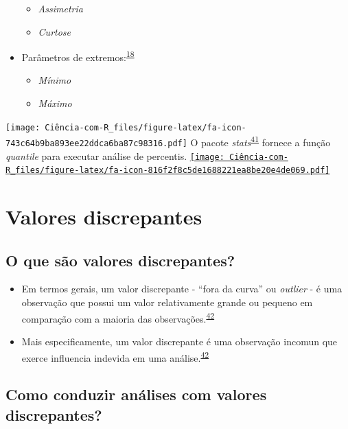 \documentclass[
]{book}
\begin{document}
\begin{itemize}
  \begin{itemize}
  \item
    \emph{Assimetria}
  \item
    \emph{Curtose}
  \end{itemize}
\item
  Parâmetros de extremos:\textsuperscript{\protect\hyperlink{ref-Ali2016}{18}}

  \begin{itemize}
  \item
    \emph{Mínimo}
  \item
    \emph{Máximo}
  \end{itemize}
\end{itemize}

\texttt{[image: Ciência-com-R\_files/figure-latex/fa-icon-743c64b9ba893ee22ddca6ba87c98316.pdf]} O pacote \emph{stats}\textsuperscript{\protect\hyperlink{ref-base}{41}} fornece a função \emph{quantile} para executar análise de percentis. \href{https://stat.ethz.ch/R-manual/R-devel/library/stats/html/quantile.html}{\texttt{[image: Ciência-com-R\_files/figure-latex/fa-icon-816f2f8c5de1688221ea8be20e4de069.pdf]}}

\hypertarget{outliers}{%
\section{Valores discrepantes}\label{outliers}}

\hypertarget{o-que-suxe3o-valores-discrepantes}{%
\subsection{O que são valores discrepantes?}\label{o-que-suxe3o-valores-discrepantes}}

\begin{itemize}
\item
  Em termos gerais, um valor discrepante - ``fora da curva'' ou \emph{outlier} - é uma observação que possui um valor relativamente grande ou pequeno em comparação com a maioria das observações.\textsuperscript{\protect\hyperlink{ref-zuur2009}{42}}
\item
  Mais especificamente, um valor discrepante é uma observação incomun que exerce influencia indevida em uma análise.\textsuperscript{\protect\hyperlink{ref-zuur2009}{42}}
\end{itemize}

\hypertarget{como-conduzir-anuxe1lises-com-valores-discrepantes}{%
\subsection{Como conduzir análises com valores discrepantes?}\label{como-conduzir-anuxe1lises-com-valores-discrepantes}}
\end{document}
